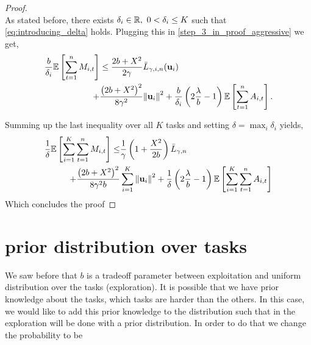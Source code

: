 {\begin{proof}
\begin{equation}
\end{equation}
As stated before, there exists $\delta_i\in\mathbb{R},~ 0<\delta_i\le K$ such that \eqref{eq:introducing_delta}
holds.
Plugging this in \eqref{step_3_in_proof_aggressive} we get,
\begin{equation}\label{eq:bound_for_i_aggressive}
\begin{split}
\frac{b}{\delta_i}\mathbb{E}\left[{\sum_{t=1}^{n}{M_{i,t}}}\right]
&\le \frac{2b+X^2}{2\gamma}{\bar L}_{\gamma,i,n}(\mathbf{u}_{i})\\
+&\frac{\left({2b+X^2}\right)^2}{8{\gamma}^2}{\left\Vert \mathbf{u}_{i} \right\Vert}^2+ 
     \frac{b}{\delta_i}\left({2\frac{\lambda}{b}-1}\right)\mathbb{E}\left[{\sum_{t=1}^{n}{A_{i,t}}}\right].
\end{split}
\end{equation}

Summing up the last inequality over all $K$ tasks and setting $\delta
= \max_i \delta_i$ yields,
\begin{equation*}
\begin{split}
\frac{1}{\delta}\mathbb{E}\left[ \sum_{i=1}^{K}\sum_{t=1}^{n}{M_{i,t}} \right]
\le&\frac{1}{\gamma}\left(1+\frac{X^2}{2b} \right){\bar L}_{\gamma,n}\\
+\frac{\left({2b+X^2}\right)^2}{8{\gamma}^2b}&\sum_{i=1}^{K}{{\left\Vert \mathbf{u}_{i} \right\Vert}^2}+ \frac{1}{\delta}\left({2\frac{\lambda}{b}-1}\right)\mathbb{E}\left[{\sum_{i=1}^{K}\sum_{t=1}^{n}{A_{i,t}}}\right]
\end{split}
\end{equation*}
Which concludes the proof
\QED
\end{proof}

\section{prior distribution over tasks}

We saw before that $b$ is a tradeoff parameter between  exploitation and uniform  distribution over the tasks (exploration). It is possible that we have prior knowledge about the tasks, which tasks are harder than the others. In this case, we would like to add this prior knowledge to the distribution such that in the exploration will be done with  a prior distribution.       
In order to do that we change the probability to be 

}
